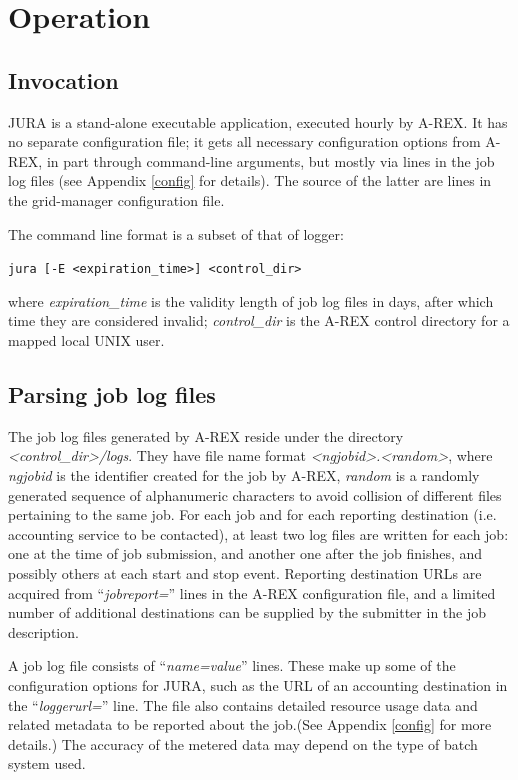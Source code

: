 \documentclass{article}                            %
\begin{document}
\section{Operation}

\subsection{Invocation}

JURA is a stand-alone executable application, executed hourly by
A-REX. It has no separate configuration file; it gets all necessary
configuration options from A-REX, in part through command-line
arguments, but mostly via lines in the job log files (see Appendix
\ref{config} for details). The source of the latter are lines in the
grid-manager configuration file.

The command line format is a subset of that of logger: %

\verb|jura [-E <expiration_time>] <control_dir>|

where \textit{expiration\_time} is the validity length of job log
files in days, after which time they are considered invalid;
\textit{control\_dir} is the A-REX control directory for a mapped
local UNIX user.

\subsection{Parsing job log files}
\label{joblogs}
The job log files generated by A-REX reside under the directory
\textit{<control\_dir>/logs}. They have file name format
\textit{<ngjobid>.<random>}, where \textit{ngjobid} is the identifier
created for the job by A-REX, \textit{random} is a randomly generated
sequence of alphanumeric characters to avoid collision of different
files pertaining to the same job. For each job and for each reporting
destination (i.e. accounting service to be contacted), at least two
log files are written for each job: one at the time of job submission,
and another one after the job finishes, and possibly others at each
start and stop event. Reporting destination URLs are acquired from
``\textit{jobreport=}'' lines in the A-REX configuration file, and a
limited number of additional destinations can be supplied by the
submitter in the job description.

A job log file consists of ``\textit{name=value}'' lines.  These
make up some of the configuration options for JURA, such as the URL of
an accounting destination in the ``\textit{loggerurl=}'' line. The
file also contains detailed resource usage data and related metadata
to be reported about the job.(See Appendix \ref{config} for more
details.)  The accuracy of the metered data may depend on the type of
batch system used.
\end{document}

